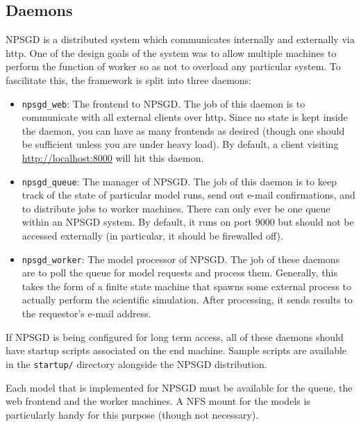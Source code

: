 \documentclass{article}
\newcommand{\mpath}[1]{\texttt{#1}}
\begin{document}
\subsection{Daemons}
NPSGD is a distributed system which communicates internally and externally via
http. One of the design goals of the system was to allow multiple machines to
perform the function of worker so as not to overload any particular system. To
fascilitate this, the framework is split into three daemons:
\begin{itemize}
    \item \texttt{npsgd\_web}: The frontend to NPSGD. The job of this daemon is
    to communicate with all external clients over http. Since no state is kept
    inside the daemon, you can have as many frontends as desired (though one
    should be sufficient unless you are under heavy load). By default, a
    client visiting \url{http://localhost:8000} will hit this daemon.

    \item \texttt{npsgd\_queue}: The manager of NPSGD. The job of this daemon is
    to keep track of the state of particular model runs, send out e-mail
    confirmations, and to distribute jobs to worker machines. There can only
    ever be one queue within an NPSGD system. By default, it runs on port 9000
    but should not be accessed externally (in particular, it should be
    firewalled off).

    \item \texttt{npsgd\_worker}: The model processor of NPSGD. The job of these
    daemons are to poll the queue for model requests and process them.
    Generally, this takes the form of a finite state machine that spawns some
    external process to actually perform the scientific simulation. After
    processing, it sends results to the requestor's e-mail address.
\end{itemize}

If NPSGD is being configured for long term access, all of these daemons should
have startup scripts associated on the end machine. Sample scripts are available
in the \mpath{startup/} directory alongside the NPSGD distribution.

Each model that is implemented for NPSGD must be available for the queue, the
web frontend and the worker machines. A NFS mount for the models is particularly
handy for this purpose (though not necessary).
\end{document}
